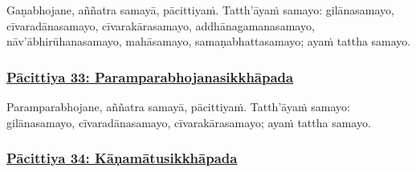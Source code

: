 Gaṇabhojane, aññatra samayā, pācittiyaṁ. Tatth'āyaṁ samayo: gilānasamayo,\makeatletter\hyperlink{endnote282-appendix}\makeatother{} cīvaradānasamayo, cīvarakārasamayo, addhānagamanasamayo, nāv'ābhirūhanasamayo,\makeatletter\hyperlink{endnote283-appendix}\makeatother{} mahāsamayo, samaṇabhattasamayo; ayaṁ tattha samayo.



\subsubsection*{\hyperref[exp33]{Pācittiya 33: Paramparabhojanasikkhāpada}}
\label{pac33}

Paramparabhojane,\makeatletter\hyperlink{endnote284-appendix}\makeatother{} aññatra samayā, pācittiyaṁ. Tatth'āyaṁ samayo: gilānasamayo,\makeatletter\hyperlink{endnote285-appendix}\makeatother{} cīvaradānasamayo, cīvarakārasamayo; ayaṁ tattha samayo.



\subsubsection*{\hyperref[exp34]{Pācittiya 34: Kāṇamātusikkhāpada}}
\label{pac34}


